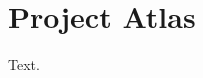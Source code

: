 \documentclass{article}
\DeclareRobustCommand{\proj}{Atlas}
\begin{document}
\tableofcontents
\section{Project \proj}
Text.
\end{document}
